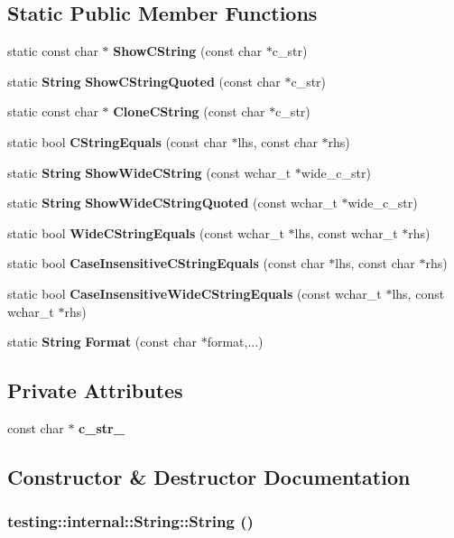 \subsection*{Static Public Member Functions}
\begin{CompactItemize}
\item 
static const char $\ast$ {\bf ShowCString} (const char $\ast$c\_\-str)
\item 
static {\bf String} {\bf ShowCStringQuoted} (const char $\ast$c\_\-str)
\item 
static const char $\ast$ {\bf CloneCString} (const char $\ast$c\_\-str)
\item 
static bool {\bf CStringEquals} (const char $\ast$lhs, const char $\ast$rhs)
\item 
static {\bf String} {\bf ShowWideCString} (const wchar\_\-t $\ast$wide\_\-c\_\-str)
\item 
static {\bf String} {\bf ShowWideCStringQuoted} (const wchar\_\-t $\ast$wide\_\-c\_\-str)
\item 
static bool {\bf WideCStringEquals} (const wchar\_\-t $\ast$lhs, const wchar\_\-t $\ast$rhs)
\item 
static bool {\bf CaseInsensitiveCStringEquals} (const char $\ast$lhs, const char $\ast$rhs)
\item 
static bool {\bf CaseInsensitiveWideCStringEquals} (const wchar\_\-t $\ast$lhs, const wchar\_\-t $\ast$rhs)
\item 
static {\bf String} {\bf Format} (const char $\ast$format,...)
\end{CompactItemize}
\subsection*{Private Attributes}
\begin{CompactItemize}
\item 
const char $\ast$ {\bf c\_\-str\_\-}
\end{CompactItemize}


\subsection{Constructor \& Destructor Documentation}
\subsubsection{\setlength{\rightskip}{0pt plus 5cm}testing::internal::String::String ()\hspace{0.3cm}{\tt  [inline]}}\label{classtesting_1_1internal_1_1String_35327ddfa6aab232855df3eb10198685}


